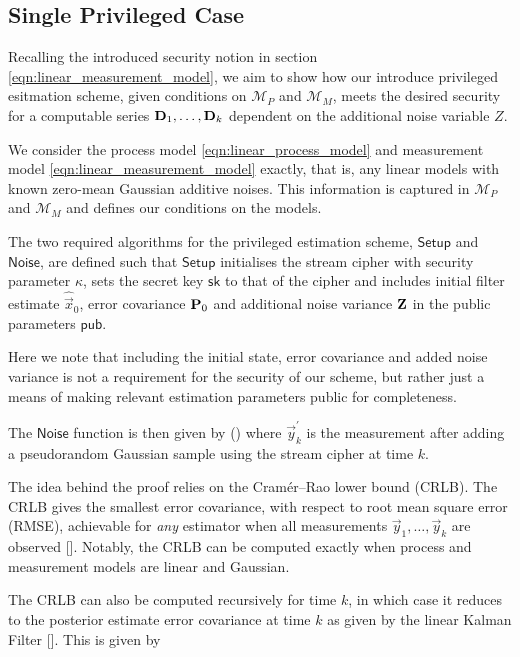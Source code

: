 \documentclass[letterpaper, 10 pt, conference]{IEEEtran}
\theoremstyle{definition}
\theoremstyle{definition}
\theoremstyle{remark}
\begin{document}
\subsection{Single Privileged Case}
Recalling the introduced security notion in section \eqref{eqn:linear_measurement_model}, we aim to show how our introduce privileged esitmation scheme, given conditions on $\mathcal{M}_P$ and $\mathcal{M}_M$, meets the desired security for a computable series ${{\mathbf{D}}}_1,\dots,{{\mathbf{D}}}_k$ dependent on the additional noise variable $Z$.

We consider the process model \eqref{eqn:linear_process_model} and measurement model \eqref{eqn:linear_measurement_model} exactly, that is, any linear models with known zero-mean Gaussian additive noises. This information is captured in $\mathcal{M}_P$ and $\mathcal{M}_M$ and defines our conditions on the models.

The two required algorithms for the privileged estimation scheme, $\mathsf{Setup}$ and $\mathsf{Noise}$, are defined such that $\mathsf{Setup}$ initialises the stream cipher with security parameter $\kappa$, sets the secret key $\mathsf{sk}$ to that of the cipher and includes initial filter estimate $\hat{\vec{x}}_0$, error covariance ${{\mathbf{P}}}_0$ and additional noise variance ${{\mathbf{Z}}}$ in the public parameters $\mathsf{pub}$.

Here we note that including the initial state, error covariance and added noise variance is not a requirement for the security of our scheme, but rather just a means of making relevant estimation parameters public for completeness.

The $\mathsf{Noise}$ function is then given by () where $\vec{y}^\prime_k$ is the measurement after adding a pseudorandom Gaussian sample using the stream cipher at time $k$.

The idea behind the proof relies on the Cramér–Rao lower bound (CRLB). The CRLB gives the smallest error covariance, with respect to root mean square error (RMSE), achievable for \textit{any} estimator when all measurements $\vec{y}_1,\dots,\vec{y}_k$ are observed []. Notably, the CRLB can be computed exactly when process and measurement models are linear and Gaussian.

The CRLB can also be computed recursively for time $k$, in which case it reduces to the posterior estimate error covariance at time $k$ as given by the linear Kalman Filter []. This is given by
\end{document}
